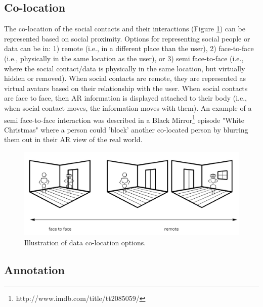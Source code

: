 \subsection{Co-location}


The co-location of the social contacts and their interactions (Figure \ref{fig:continuum:data-colocation}) can be represented based on social proximity. Options for representing social people or data can be in: 
1) remote (i.e., in a different place than the user), 
2) face-to-face (i.e., physically in the same location as the user), or 
3) semi face-to-face (i.e., where the social contact/data is physically in the same location, but virtually hidden or removed). When social contacts are remote, they are represented as virtual avatars based on their relationship with the user. When social contacts are face to face, then AR information is displayed attached to their body (i.e., when social contact moves, the information moves with them). 
An example of a semi face-to-face interaction was described in a Black Mirror\footnote{http://www.imdb.com/title/tt2085059/} episode "White Christmas" where a person could 'block' another co-located person by blurring them out in their AR view of the real world.

\begin{figure}[h]
    \centering
    \includegraphics[width=0.8\linewidth]{images/30-continuum/continuum-colocation.jpg}
    \caption{Illustration of data co-location options.}
    \label{fig:continuum:data-colocation}
\end{figure}


\subsection{Annotation}

